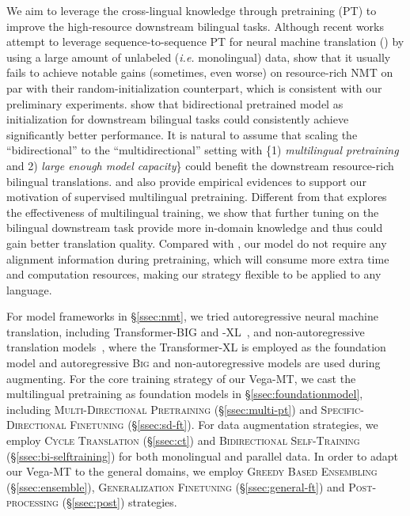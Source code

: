 \documentclass[11pt,a4paper]{article}
\newcommand{\zct}{\color{black}}
\begin{document}
We aim to leverage the cross-lingual knowledge through pretraining (PT) to improve the high-resource downstream bilingual tasks. Although recent works~\cite{song2019mass,bart2020,Liu:2020mbart,wang-etal-2022-understanding} attempt to leverage sequence-to-sequence PT for neural machine translation (\citealp[NMT;][]{bahdanau2014neural,DBLP:journals/corr/GehringAGYD17,DBLP:journals/corr/VaswaniSPUJGKP17}) by using a large amount of unlabeled (\textit{i.e.} monolingual) data, \citet{Zan2022PTvsRI} show that it usually fails to achieve notable gains (sometimes, even worse) on resource-rich NMT on par with their random-initialization counterpart, which is consistent with our preliminary experiments. \citet{ding2021improving} show that bidirectional pretrained model as initialization for downstream bilingual tasks could consistently achieve significantly better performance. It is natural to assume that scaling the ``bidirectional'' to the ``multidirectional'' setting with \{1) \textit{multilingual pretraining} and 2) \textit{large enough model capacity}\} could benefit the downstream resource-rich bilingual translations. \citet{facebook2021} and \citet{lin2020pre} also provide empirical evidences to support our motivation of supervised multilingual pretraining. Different from \citet{facebook2021} that explores the effectiveness of multilingual training, we show that further tuning on the bilingual downstream task provide more in-domain knowledge and thus could gain better translation quality. Compared with \citet{lin2020pre}, our model do not require any alignment information during pretraining, which will consume more extra time and computation resources, making our strategy {\zct flexible to be applied to any language}.

For model frameworks in \S\ref{ssec:nmt}, we tried autoregressive neural machine translation, including Transformer-\textsc{BIG} and -\textsc{XL}~\cite{transformer}, and non-autoregressive translation models~\cite{gu2018non}, where the Transformer-\textsc{XL} is employed as the foundation model and autoregressive \textsc{Big} and {\zct non-autoregressive} models are used during augmenting. 
For the core training strategy of our Vega-MT, we cast the multilingual pretraining as foundation models in \S\ref{ssec:foundationmodel}, including \textsc{Multi-Directional Pretraining} (\S\ref{ssec:multi-pt}) and \textsc{Specific-Directional Finetuning} (\S\ref{ssec:sd-ft}). 
For data augmentation strategies, we employ \textsc{Cycle Translation} (\S\ref{ssec:ct}) and \textsc{Bidirectional Self-Training} (\S\ref{ssec:bi-selftraining}) for both monolingual and parallel data.
In order to adapt our Vega-MT to the general domains, we employ \textsc{Greedy Based Ensembling} (\S\ref{ssec:ensemble}), \textsc{Generalization Finetuning} (\S\ref{ssec:general-ft}) and \textsc{Post-processing} (\S\ref{ssec:post}) strategies.
\end{document}
